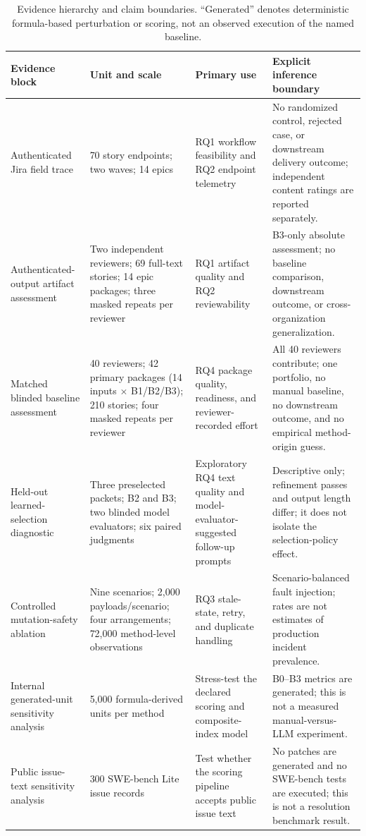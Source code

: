 \documentclass[manuscript,review]{acmart}
\begin{document}
\begin{table}[t]
\centering
\footnotesize
\caption{Evidence hierarchy and claim boundaries. ``Generated'' denotes deterministic formula-based perturbation or scoring, not an observed execution of the named baseline.}
\label{tab:evidence-hierarchy}
\begin{tabularx}{\textwidth}{@{}p{}p{}p{}X@{}}
\toprule
Evidence block & Unit and scale & Primary use & Explicit inference boundary \\
\midrule
Authenticated Jira field trace & 70 story endpoints; two waves; 14 epics & RQ1 workflow feasibility and RQ2 endpoint telemetry & No randomized control, rejected case, or downstream delivery outcome; independent content ratings are reported separately. \\
Authenticated-output artifact assessment & Two independent reviewers; 69 full-text stories; 14 epic packages; three masked repeats per reviewer & RQ1 artifact quality and RQ2 reviewability & B3-only absolute assessment; no baseline comparison, downstream outcome, or cross-organization generalization. \\
Matched blinded baseline assessment & 40 reviewers; 42 primary packages (14 inputs $\times$ B1/B2/B3); 210 stories; four masked repeats per reviewer & RQ4 package quality, readiness, and reviewer-recorded effort & All 40 reviewers contribute; one portfolio, no manual baseline, no downstream outcome, and no empirical method-origin guess. \\
Held-out learned-selection diagnostic & Three preselected packets; B2 and B3; two blinded model evaluators; six paired judgments & Exploratory RQ4 text quality and model-evaluator-suggested follow-up prompts & Descriptive only; refinement passes and output length differ; it does not isolate the selection-policy effect. \\
Controlled mutation-safety ablation & Nine scenarios; 2,000 payloads/scenario; four arrangements; 72,000 method-level observations & RQ3 stale-state, retry, and duplicate handling & Scenario-balanced fault injection; rates are not estimates of production incident prevalence. \\
Internal generated-unit sensitivity analysis & 5,000 formula-derived units per method & Stress-test the declared scoring and composite-index model & B0--B3 metrics are generated; this is not a measured manual-versus-LLM experiment. \\
Public issue-text sensitivity analysis & 300 SWE-bench Lite issue records & Test whether the scoring pipeline accepts public issue text & No patches are generated and no SWE-bench tests are executed; this is not a resolution benchmark result. \\
\bottomrule
\end{tabularx}
\end{table}
\end{document}
